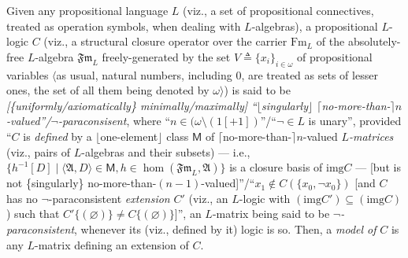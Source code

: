 \documentclass[bsl,meeting]{asl}
\newcommand{\NP}{}
\newcommand{\mf}[1]{\mathfrak{#1}}
\newcommand{\msf}[1]{\mathsf{#1}}
\newcommand{\couple}[2]{\langle{#1},{#2}\rangle}
\newcommand{\FA}{\mathfrak{Fm}}
\newcommand{\inverse}[1]{{#1}^{-1}}
\newcommand{\Fm}{\mathrm{Fm}}
\newcommand{\img}{\mathrm{img}}
\begin{document}
\thispagestyle{empty}


\NP
{}



Given any propositional language $L$
(viz., a set of propositional connectives,
treated as operation symbols, when dealing
with $L$-algebras),
a propositional $L$-logic $C$ %
(viz., a structural %
closure operator over the carrier $\Fm_L$
of the absolutely-free $L$-algebra $\FA_L$
freely-generated by the set $V\triangleq\{x_i\}_{i\in\omega}$
of propositional variables
$\langle$as usual, natural numbers, including $0$,
are treated as sets of lesser ones,
the set of all them being denoted by $\omega\rangle$)
is said to be {\em [\/\{uniformly/axiomatically\/\} minimally/maximally]\/
``\/$\lfloor$singularly\/$\rfloor$
$\lceil$no-more-than-$\rceil n$-valued''/$\neg$-paraconsisent},
whe\-re ``$n\in(\omega\setminus(1[+1])$''/``$\neg\in L$ is unary'',
provided ``$C$ is {\em defined\/} by a
$\lfloor$one-element$\rfloor$ class $\msf{M}$ of $\lceil$no-more-than-$\rceil n$-valued
{\em $L$-matrices\/}
(viz., pairs of %
$L$-algebras and their
subsets)
--- i.e., $\{\inverse{h}[D]\mid\couple{\mf{A}}{D}\in\msf{M},
h\in\hom(\FA_L,\mf{A})\}$
is a closure basis of $\img C$ ---
[but is not \{singularly\} no-more-than-$(n-1)$-valued]''/``$x_1\not\in
C(\{x_0,\neg x_0\})$ [and $C$ has no $\neg$-paraconsistent
{\em extension\/} $C'$ (viz., an $L$-logic with $(\img C')\subseteq(\img C)$)
such that $C'\{(\varnothing)\}\neq C\{(\varnothing)\}$]'',
an $L$-matrix being said to be {\em $\neg$-paraconsistent},
whenever its (viz., defined by it) logic
is so.
Then, a {\em model of\/} $C$ is any $L$-matrix defining an
extension of $C$.
\end{document}
